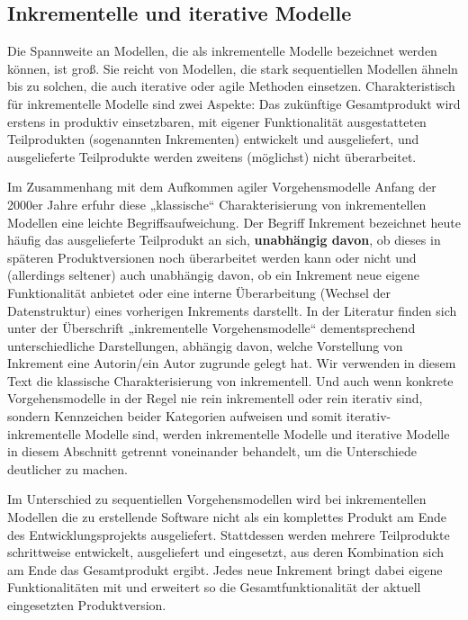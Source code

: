 \subsection{Inkrementelle und iterative Modelle}
\label{sec:Kap-2.2.2}


Die  Spannweite an Modellen, die als inkrementelle Modelle bezeichnet werden können, ist groß. Sie reicht von Modellen, die stark sequentiellen Modellen ähneln bis zu solchen, die auch iterative oder agile Methoden einsetzen. Charakteristisch für inkrementelle Modelle sind zwei Aspekte: Das zukünftige Gesamtprodukt wird erstens in produktiv einsetzbaren, mit eigener Funktionalität ausgestatteten Teil\-produkten (sogenannten Inkrementen) entwickelt und ausgeliefert, und ausgelieferte Teil\-produkte werden zweitens (möglichst) nicht überarbeitet. 


Im Zusammenhang mit dem Aufkommen agiler Vorgehensmodelle Anfang der 2000er Jahre erfuhr diese „klassische“ Charakterisierung von inkrementellen Modellen eine leichte Begriffsaufweichung. Der Begriff Inkrement bezeichnet heute häufig das ausgelieferte Teilprodukt an sich, \textbf{unabhängig davon}, ob dieses in späteren Produktversionen noch überarbeitet werden kann oder nicht und (allerdings seltener) auch unabhängig davon, ob ein Inkrement neue eigene Funktionalität anbietet oder eine interne Überarbeitung (\zb Wechsel der Datenstruktur) eines vorherigen Inkrements darstellt. In der Literatur finden sich unter der Überschrift „inkrementelle Vorgehensmodelle“ dementsprechend unterschiedliche Darstellungen, abhängig davon, welche Vorstellung von Inkrement eine Autorin/ein Autor zugrunde gelegt hat. Wir verwenden in diesem Text die klassische Charakterisierung von inkrementell. Und auch wenn konkrete Vorgehensmodelle in der Regel nie rein inkrementell oder rein iterativ sind, sondern Kennzeichen beider Kategorien aufweisen und somit iterativ-inkrementelle Modelle sind, werden inkrementelle Modelle und iterative Modelle in diesem Abschnitt getrennt voneinander behandelt, um die Unterschiede deutlicher zu machen.

Im  Unterschied zu sequen\-tiel\-len Vorgehensmodellen wird bei inkrementellen Modellen die zu erstellende Software nicht als ein komplettes Produkt am Ende des Entwicklungsprojekts ausgeliefert. Stattdessen werden mehrere Teilprodukte schrittweise entwickelt, ausgeliefert und eingesetzt, aus deren Kombination sich am Ende das Gesamtprodukt ergibt. Jedes neue Inkrement bringt dabei eigene Funktionalitäten mit und erweitert so die Gesamtfunktionalität der aktuell eingesetzten Produktversion.


